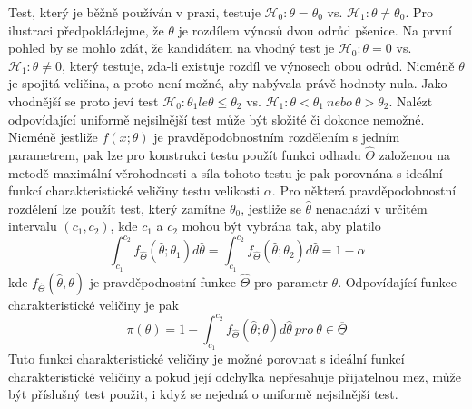 Test, který je běžně používán v praxi, testuje $\mathscr{H}_0: \theta = \theta_0$ vs. $\mathscr{H}_1: \theta \neq \theta_0$. Pro ilustraci předpokládejme, že $\theta$ je rozdílem výnosů dvou odrůd pšenice. Na první pohled by se mohlo zdát, že kandidátem na vhodný test je $\mathscr{H}_0: \theta = 0$ vs. $\mathscr{H}_1: \theta \neq 0$, který testuje, zda-li existuje rozdíl ve výnosech obou odrůd. Nicméně $\theta$ je spojitá veličina, a proto není možné, aby nabývala právě hodnoty nula. Jako vhodnější se proto jeví test $\mathscr{H}_0: \theta_1 le \theta \le \theta_2$ vs. $\mathscr{H}_1: \theta < \theta_1 ~ \textit{nebo} ~ \theta > \theta_2$. Nalézt odpovídající uniformě nejsilnější test může být složité či dokonce nemožné. Nicméně jestliže $f(x; \theta)$ je pravděpodobnostním rozdělením s jedním parametrem, pak lze pro konstrukci testu použít funkci odhadu $\hat{\Theta}$ založenou na metodě maximální věrohodnosti a síla tohoto testu je pak porovnána s ideální funkcí charakteristické veličiny testu velikosti $\alpha$. Pro některá pravděpodobnostní rozdělení lze použít test, který zamítne $\theta_0$, jestliže se $\hat{\theta}$ nenachází v určitém intervalu $(c_1, c_2)$, kde $c_1$ a $c_2$ mohou být vybrána tak, aby platilo
\begin{equation*}
\int_{c_1}^{c_2} f_{\hat{\Theta}}(\hat{\theta}; \theta_1)d \hat{\theta} = \int_{c_1}^{c_2} f_{\hat{\Theta}}(\hat{\theta}; \theta_2)d \hat{\theta} = 1 - \alpha
\end{equation*}
kde $f_{\hat{\Theta}}(\hat{\theta}, \theta)$ je pravděpodnostní funkce $\hat{\Theta}$ pro parametr $\theta$. Odpovídající funkce charakteristické veličiny je pak
\begin{equation*}
\pi(\theta) = 1 - \int_{c_1}^{c_2}f_{\hat{\Theta}}(\hat{\theta}; \theta) d \hat{\theta} ~ \textit{pro} ~ \theta \in \overline{\underline{\Theta}}
\end{equation*}
Tuto funkci charakteristické veličiny je možné porovnat s ideální funkcí charakteristické veličiny a pokud její odchylka nepřesahuje přijatelnou mez, může být příslušný test použit, i když se nejedná o uniformě nejsilnější test.

